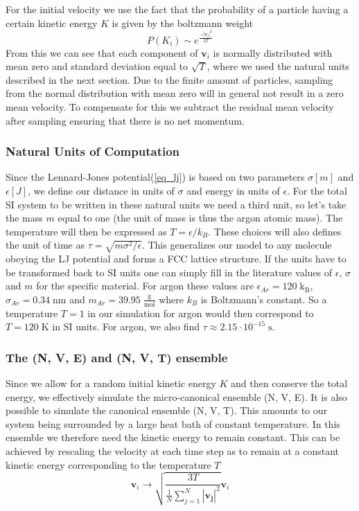 \documentclass[twoside]{article}
\newcommand{\unit}[1]{\ensuremath{\; \mathrm{#1}}}
\begin{document}
For the initial velocity we use the fact that the probability of a particle having a certain kinetic energy $K$ is given by the boltzmann weight 
\begin{equation}\label{eq_boltzmann}
P(K_i) \sim e^{\frac{-|\mathbf{v}_i|^2}{2T}}
\end{equation}
From this we can see that each component of $\mathbf{v}_i$ is normally distributed with mean zero and standard deviation equal to $\sqrt{T}$, where we used the natural units described in the next section. Due to the finite amount of particles, sampling from the normal distribution with mean zero will in general not result in a zero mean velocity. To compensate for this we subtract the residual mean velocity after sampling ensuring that there is no net momentum.  


\subsubsection*{Natural Units of Computation}
Since the Lennard-Jones potential(\eqref{eq_lj}) is based on two parameters $\sigma [m]$ and $\epsilon [J]$, we define our distance in units of $\sigma$ and energy in units of $\epsilon$. For the total SI system to be written in these natural units we need a third unit, so let's take the mass $m$ equal to one (the unit of mass is thus the argon atomic mass). The temperature will then be expressed as $T  = \epsilon/k_B$. These choices will also defines the unit of time as $\tau = \sqrt{m\sigma^2/\epsilon}$. This generalizes our model to any molecule obeying the LJ potential and forms a FCC lattice structure. If the units have to be transformed back to SI units one can simply fill in the literature values of $\epsilon$, $\sigma$ and $m$ for the specific material. For argon these values are $\epsilon_{Ar} = 120 \unit{k_B}$, $\sigma_{Ar} = 0.34 \unit{nm}$ and $m_{Ar} = 39.95 \unit{\frac{g}{mol}}$ where $k_B$ is Boltzmann's constant. So a temperature $T = 1$ in our simulation for argon would then correspond to $T = 120 \unit{K}$ in SI units. For argon, we also find $\tau \approx 2.15 \cdot 10^{-15} \unit{s}$.

\subsubsection*{The (N, V, E) and (N, V, T) ensemble}
Since we allow for a random initial kinetic energy $K$ and then conserve the total energy, we effectively simulate the micro-canonical ensemble (N, V, E). It is also possible to simulate the canonical ensemble (N, V, T). This amounts to our system being surrounded by a large heat bath of constant temperature. In this ensemble we therefore need the kinetic energy to remain constant. This can be achieved by rescaling the velocity at each time step as to remain at a constant kinetic energy corresponding to the temperature $T$
\begin{equation}\label{eq_vel_rescale}
\mathbf{v}_i \rightarrow \sqrt{\frac{3 T}{\frac{1}{N} \sum_{j=1}^N |\mathbf{v_j}|^2}} \mathbf{v}_i
\end{equation}
\end{document}
